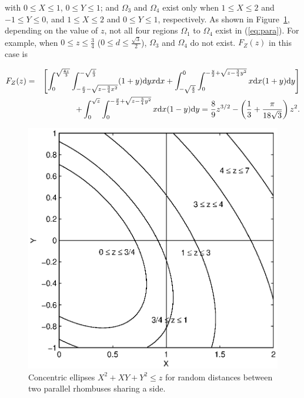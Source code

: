 \documentclass[12pt,draftclsnofoot,onecolumn]{IEEEtran}
\begin{document}
with $0 \leq X \leq 1$, $0 \leq Y \leq 1$; and $\Omega_3$ and $\Omega_4$ exist only when
$1 \leq X \leq 2$ and $-1 \leq Y \leq 0$, and $1 \leq X \leq 2$ and $0 \leq Y
\leq 1$, respectively.
As shown in Figure~\ref{fig:para}, depending on the value of $z$, not all four regions
$\Omega_1$ to $\Omega_4$ exist in (\ref{eq:para}). For example, when $0\leq z
\leq \frac{3}{4}$ ($0\leq d\leq \frac{\sqrt{3}}{2}$), $\Omega_3$ and $\Omega_4$ 
do not exist. $F_Z(z)$ in this case is
\begin{small}
\begin{eqnarray}\label{eq:Z1_r_para}
 F_Z(z)&=&\left[\int_0^{\sqrt{\frac{4z}{3}}}\int_{-\frac{x}{2}-\sqrt{z-\frac{3}{
4}x^2}}^{-\sqrt{\frac{z}{3}}}(1+y){\rm d}yx{\rm d}x+\int_{-\sqrt{\frac{z}{3}}}
^0\int_0^{-\frac{y}{2}+\sqrt{z-\frac{3}{4}y^2}}x{\rm d}x(1+y){\rm d}y\right]
\nonumber\\
&&+\int_0^{\sqrt{z}}\int_0^{-\frac{y}{2}+\sqrt{z-\frac{3}{4}y^2}}
x{\rm d}x(1-y){\rm
d}y=\frac{8}{9}z^{3/2}-\left(\frac{1}{3}+\frac{\pi}{18\sqrt{3}}
\right)z^2.
\end{eqnarray}
\end{small}

\begin{figure}
  \centering
  \includegraphics[width=0.5\columnwidth]{fig/rhombus_para}
  \caption{Concentric ellipses $X^2+XY+Y^2 \leq z$ for random distances between two parallel rhombuses sharing a side.}
  \label{fig:para}
\end{figure}
\end{document}
